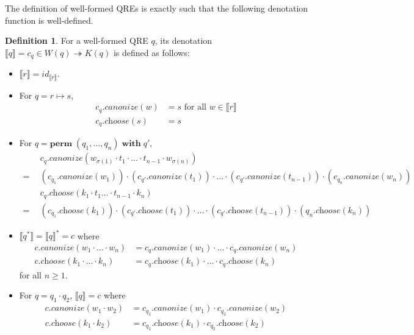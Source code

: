 \documentclass[a4paper,11pt] {article}
\theoremstyle{definition}
\newtheorem{definition}[theorem]{Definition}
\newcommand{\lcanonize}[1]{\textit{$#1$.canonize}}
\newcommand{\lchoose}[1]{\textit{$#1$.choose}}
\newcommand{\canon}{\twoheadrightarrow}
\newcommand{\perm}{ \textbf{perm}\; }
\newcommand{\with}{ \;\textbf{with}\; }
\begin{document}
The definition of well-formed QREs is exactly such that the following
denotation function is well-defined.
\begin{definition}
  For a well-formed QRE $q$, its denotation
  $\llbracket q \rrbracket = c_q \in W(q) \canon K(q)$ is defined as follows:
  \begin{itemize}
  \item $\llbracket r \rrbracket = \mathit{id}_{\llbracket r \rrbracket}$.
  \item For $q = r \mapsto s$, 
    \begin{align*}
      \lcanonize{c_q}(w) &= s \text{ for all
        $w \in \llbracket r \rrbracket$} \\
      \lchoose{c_q}(s) &= s
    \end{align*}
  \item For $q = \perm(q_1, \ldots, q_n) \with q'$, 
    \begin{align*}
      &~~\lcanonize{c_q}(w_{\sigma(1)} \cdot t_1 \cdot \ldots \cdot t_{n-1}
      \cdot w_{\sigma(n)}) \\
      =&~~ (\lcanonize{c_{q_1}}(w_1)) \cdot (\lcanonize{c_{q'}}(t_1)) \cdot
      \ldots 
      \cdot (\lcanonize{c_{q'}}(t_{n-1})) \cdot (\lcanonize{c_{q_n}}(w_n)) \\
      &~~\lchoose{c_q}(k_1 \cdot t_1 \ldots \cdot t_{n-1} \cdot k_n) \\
      =&~~ (\lchoose{c_{q_1}}(k_1)) \cdot (\lchoose{c_{q'}}(t_1)) \cdot
      \ldots \cdot (\lchoose{c_{q'}}(t_{n-1})) \cdot (\lchoose{q_n}(k_n))
    \end{align*}
  \item $\llbracket q^* \rrbracket = \llbracket q \rrbracket^* = c$ where 
    \begin{align*}
      \lcanonize{c}(w_1 \cdot \ldots \cdot w_n) &=
      \lcanonize{c_q}(w_1) \cdot \ldots \cdot
      \lcanonize{c_q}(w_n) \\
      \lchoose{c}(k_1 \cdot \ldots \cdot k_n) &=
      \lchoose{c_q}(k_1) \cdot \ldots \cdot
      \lchoose{c_q}(k_n)
    \end{align*}
    for all $n \geq 1$.
  \item For $q = q_1 \cdot q_2$, $\llbracket q \rrbracket = c$ where 
    \begin{align*}
      \lcanonize{c}(w_1 \cdot w_2) &=
      \lcanonize{c_{q_1}}(w_1) \cdot
      \lcanonize{c_{q_2}}(w_2) \\
      \lchoose{c}(k_1 \cdot k_2) &=
      \lchoose{c_{q_1}}(k_1) \cdot
      \lchoose{c_{q_2}}(k_2)
    \end{align*}

\end{itemize}
\end{definition}
\end{document}
